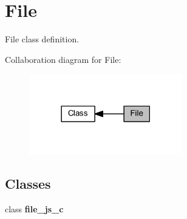 \section{File}
\label{group___file}


File class definition.  


Collaboration diagram for File\+:
\nopagebreak
\begin{figure}[H]
\begin{center}
\leavevmode
\includegraphics[width=189pt]{group___file}
\end{center}
\end{figure}
\subsection*{Classes}
\begin{DoxyCompactItemize}
\item 
class \textbf{ file\+\_\+js\+\_\+c}
\end{DoxyCompactItemize}
